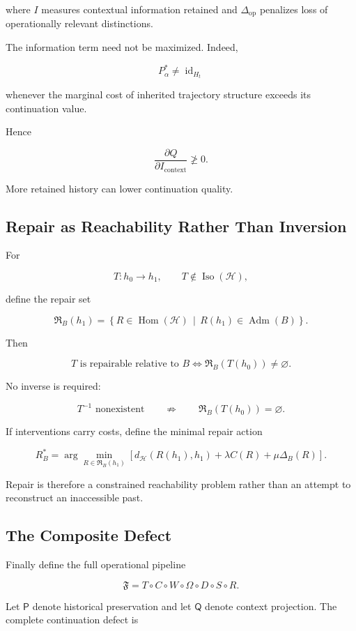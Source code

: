 \documentclass[11pt]{article}
\newcommand{\Adm}{\operatorname{Adm}}
\newcommand{\Hom}{\operatorname{Hom}}
\newcommand{\Iso}{\operatorname{Iso}}
\begin{document}
where $I$ measures contextual information retained and
$\Delta_{\mathrm{op}}$ penalizes loss of operationally relevant distinctions.

The information term need not be maximized. Indeed,

\[
P_\alpha^{*}\neq\operatorname{id}_{H_t}
\]

whenever the marginal cost of inherited trajectory structure exceeds its
continuation value.

Hence

\[
\boxed{
\frac{\partial Q}{\partial I_{\mathrm{context}}}
\not\geq0.
}
\]

More retained history can lower continuation quality.

\subsection{Repair as Reachability Rather Than Inversion}

For

\[
T:h_0\rightarrow h_1,
\qquad
T\notin\Iso(\mathcal H),
\]

define the repair set

\[
\mathfrak R_B(h_1)
=
\left\{
R\in\Hom(\mathcal H)
\,\middle|\,
R(h_1)\in\Adm(B)
\right\}.
\]

Then

\[
T\text{ is repairable relative to }B
\iff
\mathfrak R_B(T(h_0))\neq\varnothing.
\]

No inverse is required:

\[
T^{-1}\text{ nonexistent}
\qquad\not\Rightarrow\qquad
\mathfrak R_B(T(h_0))=\varnothing.
\]

If interventions carry costs, define the minimal repair action

\[
R_B^{*}
=
\arg\min_{R\in\mathfrak R_B(h_1)}
\left[
d_{\mathcal H}(R(h_1),h_1)
+
\lambda C(R)
+
\mu\Delta_B(R)
\right].
\]

Repair is therefore a constrained reachability problem rather than an attempt
to reconstruct an inaccessible past.

\subsection{The Composite Defect}

Finally define the full operational pipeline

\[
\mathfrak F
=
T\circ C\circ W\circ\Omega\circ D\circ S\circ R.
\]

Let $\mathsf P$ denote historical preservation and let
$\mathsf Q$ denote context projection. The complete continuation defect is
\end{document}
